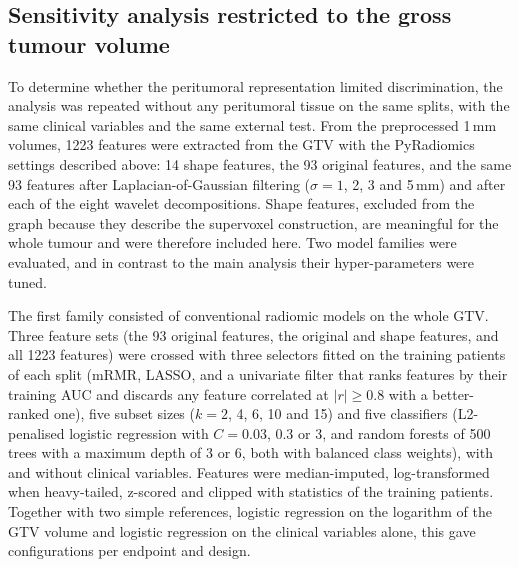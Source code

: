 \documentclass[11pt,a4paper]{article}
\begin{document}
\subsection{Sensitivity analysis restricted to the gross tumour volume}
To determine whether the peritumoral representation limited discrimination, the analysis was repeated without any peritumoral tissue on the same splits, with the same clinical variables and the same external test. From the preprocessed 1\,mm volumes, 1223 features were extracted from the GTV with the PyRadiomics settings described above: 14 shape features, the 93 original features, and the same 93 features after Laplacian-of-Gaussian filtering ($\sigma=1$, 2, 3 and 5\,mm) and after each of the eight wavelet decompositions. Shape features, excluded from the graph because they describe the supervoxel construction, are meaningful for the whole tumour and were therefore included here. Two model families were evaluated, and in contrast to the main analysis their hyper-parameters were tuned.

The first family consisted of conventional radiomic models on the whole GTV. Three feature sets (the 93 original features, the original and shape features, and all 1223 features) were crossed with three selectors fitted on the training patients of each split (mRMR, LASSO, and a univariate filter that ranks features by their training AUC and discards any feature correlated at $|r|\geq0.8$ with a better-ranked one), five subset sizes ($k=2$, 4, 6, 10 and 15) and five classifiers (L2-penalised logistic regression with $C=0.03$, 0.3 or 3, and random forests of 500 trees with a maximum depth of 3 or 6, both with balanced class weights), with and without clinical variables. Features were median-imputed, log-transformed when heavy-tailed, z-scored and clipped with statistics of the training patients. Together with two simple references, logistic regression on the logarithm of the GTV volume and logistic regression on the clinical variables alone, this gave \gtvNcls{} configurations per endpoint and design.
\end{document}
